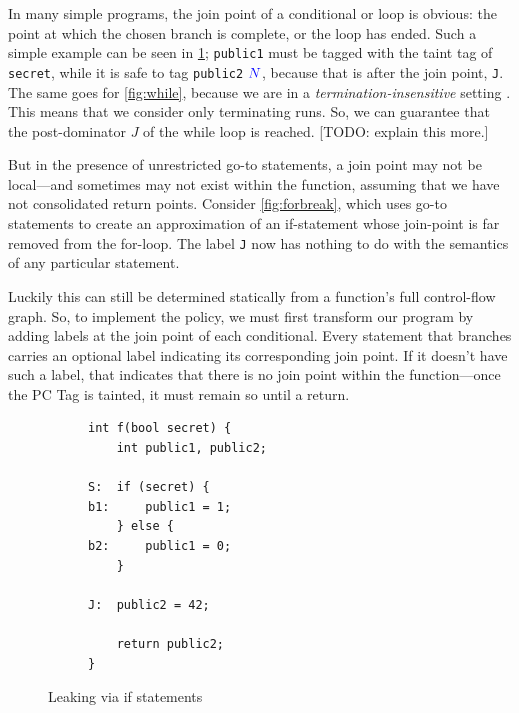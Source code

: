 \documentclass[acmsmall,review,anonymous]{acmart}\settopmatter{printfolios=true,printccs=false,printacmref=false}
\begin{document}
In many simple programs, the join point of a conditional or loop is obvious:
the point at which the chosen branch is complete, or the loop has ended.
Such a simple example can be seen in \cref{fig:ifthenelse}; {\tt public1} must be
tagged with the taint tag of {\tt secret}, while it is safe to tag {\tt public2}
\({\color{blue} N}\), because that is after the join point, {\tt J}. The same goes for \cref{fig:while},
because we are in a {\em termination-insensitive} setting \cite{}. This means that we
consider only terminating runs. So, we can guarantee that the post-dominator \(J\)
of the while loop is reached. [TODO: explain this more.]

But in the presence of unrestricted go-to statements, a join point may not be
local---and sometimes may not exist within the function, assuming that we have not
consolidated return points. Consider \cref{fig:forbreak}, which
uses go-to statements to create an approximation of an if-statement whose join-point
is far removed from the for-loop. The label {\tt J} now has nothing to do with the
semantics of any particular statement.

Luckily this can still be determined statically from a function's full
control-flow graph. So, to implement the policy, we must first transform our program
by adding labels at the join point of each conditional.
Every statement that branches carries an optional label indicating its corresponding
join point. If it doesn't have such
a label, that indicates that there is no join point within the function---once the PC Tag is tainted,
it must remain so until a return.

\begin{figure}
  \begin{subfigure}{0.5\textwidth}
\begin{verbatim}
int f(bool secret) {
    int public1, public2;

S:  if (secret) {
b1:     public1 = 1;
    } else {
b2:     public1 = 0;
    }

J:  public2 = 42;

    return public2;
}
\end{verbatim}
  \end{subfigure}
  \begin{subfigure}{0.5\textwidth}
  \end{subfigure}
  
  \caption{Leaking via if statements}
  \label{fig:ifthenelse}
\end{figure}
\end{document}
